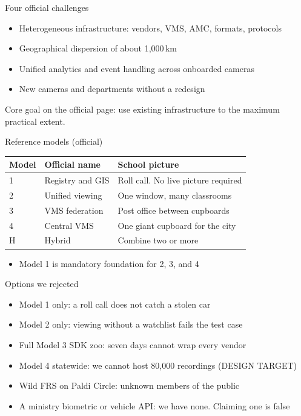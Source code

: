 \documentclass[aspectratio=169,11pt]{beamer}
\begin{document}
\begin{frame}{Four official challenges}
\begin{itemize}\itemsep0.7em
\item Heterogeneous infrastructure: vendors, VMS, AMC, formats, protocols
\item Geographical dispersion of about 1{,}000\,km
\item Unified analytics and event handling across onboarded cameras
\item New cameras and departments without a redesign
\end{itemize}
\medskip
\begin{keyideabox}
Core goal on the official page: use existing infrastructure to the maximum practical extent.
\end{keyideabox}
\end{frame}

\begin{frame}{Reference models (official)}
\begin{center}
\begin{tabular}{@{}llp{}@{}}
\toprule
Model & Official name & School picture \\
\midrule
1 & Registry and GIS & Roll call. No live picture required \\
2 & Unified viewing & One window, many classrooms \\
3 & VMS federation & Post office between cupboards \\
4 & Central VMS & One giant cupboard for the city \\
H & Hybrid & Combine two or more \\
\bottomrule
\end{tabular}
\end{center}
\medskip
\begin{itemize}\itemsep0.5em
\item Model 1 is mandatory foundation for 2, 3, and 4
\end{itemize}
\end{frame}

\begin{frame}{Options we rejected}
\begin{itemize}\itemsep0.55em
\item Model 1 only: a roll call does not catch a stolen car
\item Model 2 only: viewing without a watchlist fails the test case
\item Full Model 3 SDK zoo: seven days cannot wrap every vendor
\item Model 4 statewide: we cannot host 80{,}000 recordings (DESIGN TARGET)
\item Wild FRS on Paldi Circle: unknown members of the public
\item A ministry biometric or vehicle API: we have none. Claiming one is false
\end{itemize}
\end{frame}
\end{document}
